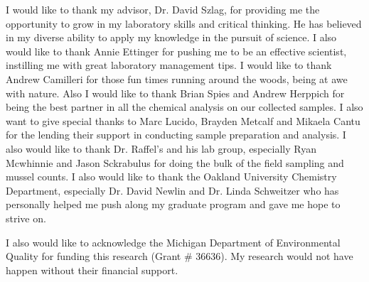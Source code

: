 
I would like to thank my advisor, Dr. David Szlag, for providing me the opportunity to grow in my laboratory skills and critical thinking. He has believed in my diverse ability to apply my knowledge in the pursuit of science. I also would like to thank Annie Ettinger for pushing me to be an effective scientist, instilling me with great laboratory management tips. I would like to thank Andrew Camilleri for those fun times running around the woods, being at awe with nature. Also I would like to thank Brian Spies and Andrew Herppich for being the best partner in all the chemical analysis on our collected samples. I also want to give special thanks to Marc Lucido, Brayden Metcalf and Mikaela Cantu for the lending their support in conducting sample preparation and analysis. I also would like to thank Dr. Raffel's and his lab group, especially Ryan Mcwhinnie and Jason Sckrabulus for doing the bulk of the field sampling and mussel counts.  I also would like to thank the Oakland University Chemistry Department, especially Dr. David Newlin and Dr. Linda Schweitzer who has personally helped me push along my graduate program and gave me hope to strive on.

I also would like to acknowledge the Michigan Department of Environmental Quality for funding this research (Grant \# 36636). My research would not have happen without their financial support.

